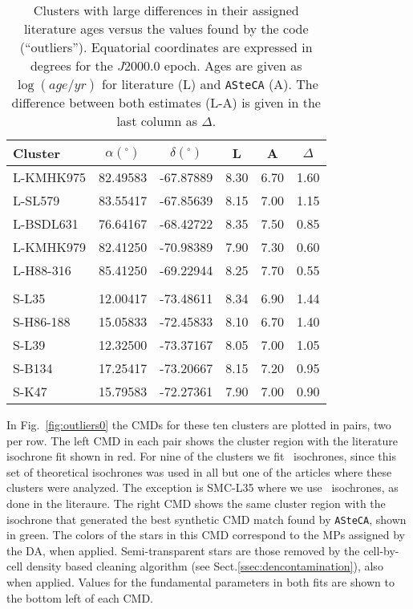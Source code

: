 \documentclass[draft]{aa}
\begin{document}
\begin{appendix}
\begin{table}
\centering
\caption{Clusters with large differences in their assigned literature ages
versus the values found by the code (``outliers'').
Equatorial coordinates are expressed in degrees for the $J2000.0$ epoch.
Ages are given as $\log(age/yr)$ for literature (L) and \texttt{ASteCA} (A).
The difference between both estimates (L-A) is given in the last column as
$\Delta$.}
\label{tab:outliers}
\begin{tabular}{lccccc}
\hline\hline
Cluster & $\alpha(^\circ)$ & $\delta(^\circ)$ & L & A & $\Delta$\\
\hline
L-KMHK975 & 82.49583 & -67.87889 & 8.30 & 6.70 & 1.60\\
L-SL579 & 83.55417 & -67.85639 & 8.15 & 7.00 & 1.15\\
L-BSDL631 & 76.64167 & -68.42722 & 8.35 & 7.50 & 0.85\\
L-KMHK979 & 82.41250 & -70.98389 & 7.90 & 7.30 & 0.60\\
L-H88-316 & 85.41250 & -69.22944 & 8.25 & 7.70 & 0.55\\
\\[-1.85ex]
S-L35 & 12.00417 & -73.48611 & 8.34 & 6.90 & 1.44\\
S-H86-188 & 15.05833 & -72.45833 & 8.10 & 6.70 & 1.40\\
S-L39 & 12.32500 & -73.37167 & 8.05 & 7.00 & 1.05\\
S-B134 & 17.25417 & -73.20667 & 8.15 & 7.20 & 0.95\\
S-K47 & 15.79583 & -72.27361 & 7.90 & 7.00 & 0.90\\
\hline
\end{tabular}
\end{table}

In Fig.~\ref{fig:outliers0} the CMDs for these ten clusters are plotted in
pairs, two per row.
The left CMD in each pair shows the cluster region with the literature isochrone
fit shown in red. For nine of the clusters we fit~\cite{Marigo_2008} isochrones,
since this set of theoretical isochrones was used in all but one of the
articles where these clusters were analyzed. The exception is SMC-L35 where we
use~\cite{Girardi_2002} isochrones, as done in the literaure.
%
The right CMD shows the same cluster region with the isochrone that generated
the best synthetic CMD match found by \texttt{ASteCA}, shown in green.
The colors of the stars in this CMD correspond to the MPs assigned by the DA,
when applied.
Semi-transparent stars are those removed by the cell-by-cell density based
cleaning algorithm (see Sect.\ref{ssec:dencontamination}), also when applied.
%
Values for the fundamental parameters in both fits are shown to the bottom left
of each CMD.\@


\end{appendix}
\end{document}

